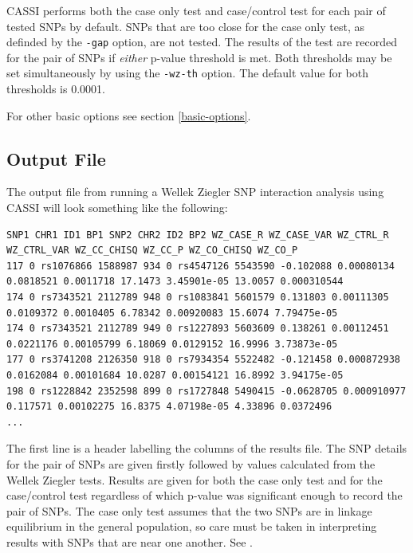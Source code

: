 \documentclass[a4paper,12pt]{article}
\newcommand{\code}[1]{{\footnotesize{{\tt #1}}}}
\begin{document}
CASSI performs both the case only test and case/control test for each pair of tested SNPs by default. SNPs that are too close for the case only test, as definded by the \code{-gap} option, are not tested. The results of the test are recorded for the pair of SNPs if {\it either} p-value threshold is met. Both thresholds may be set simultaneously by using the \code{-wz-th} option. The default value for both thresholds is 0.0001. 

For other basic options see  section \ref{basic-options}. 


\subsection{Output File}
\label{wz-output}

The output file from running a Wellek Ziegler SNP interaction analysis using CASSI will look something like the following: 
\vspace{0.35cm} \begin{lstlisting}
SNP1 CHR1 ID1 BP1 SNP2 CHR2 ID2 BP2 WZ_CASE_R WZ_CASE_VAR WZ_CTRL_R WZ_CTRL_VAR WZ_CC_CHISQ WZ_CC_P WZ_CO_CHISQ WZ_CO_P
117 0 rs1076866 1588987 934 0 rs4547126 5543590 -0.102088 0.00080134 0.0818521 0.0011718 17.1473 3.45901e-05 13.0057 0.000310544
174 0 rs7343521 2112789 948 0 rs1083841 5601579 0.131803 0.00111305 0.0109372 0.0010405 6.78342 0.00920083 15.6074 7.79475e-05
174 0 rs7343521 2112789 949 0 rs1227893 5603609 0.138261 0.00112451 0.0221176 0.00105799 6.18069 0.0129152 16.9996 3.73873e-05
177 0 rs3741208 2126350 918 0 rs7934354 5522482 -0.121458 0.000872938 0.0162084 0.00101684 10.0287 0.00154121 16.8992 3.94175e-05
198 0 rs1228842 2352598 899 0 rs1727848 5490415 -0.0628705 0.000910977 0.117571 0.00102275 16.8375 4.07198e-05 4.33896 0.0372496
...

\end{lstlisting} \vspace{0.35cm}
The first line is a header labelling the columns of the results file. The SNP details for the pair of SNPs are given firstly followed by values calculated from the Wellek Ziegler tests. Results are given for both the case only test and for the case/control test regardless of which p-value was significant enough to record the pair of SNPs. The case only test assumes that the two SNPs are in linkage equilibrium in the general population, so care must be taken in interpreting results with SNPs that are near one another. See \citet{ueki:etal:12}. 
\end{document}
